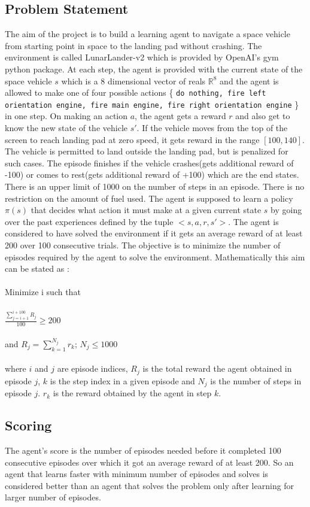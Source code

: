 \documentclass{svproc}
\begin{document}
\subsection*{Problem Statement}
The aim of the project is to build a learning agent to navigate a space vehicle from starting point in space to the landing pad without crashing. The environment is called LunarLander-v2 which is provided by OpenAI's gym python package. At each step, the agent is provided with the current state of the space vehicle $s$ which is a 8 dimensional vector of reals $\mathbb{R}^8$ and the agent is allowed to make one of four possible actions \{ \texttt{do nothing, fire left orientation engine, fire main engine, fire right orientation engine} \} in one step. On making an action $a$, the agent gets a reward $r$ and also get to know the new state of the vehicle $s'$. If the vehicle moves from the top of the screen to reach landing pad at zero speed, it gets reward in the range $[100, 140]$. The vehicle is permitted to land outside the landing pad, but is penalized for such cases. The episode finishes if the vehicle crashes(gets additional reward of -100) or comes to rest(gets additional reward of +100) which are the end states. There is an upper limit of 1000 on the number of steps in an episode. There is no restriction on the amount of fuel used. The agent is supposed to learn a policy $\pi(s)$ that decides what action it must make at a given current state $s$ by going over the past experiences defined by the tuple $<s, a, r, s'>$. The agent is considered to have solved the environment if it gets an average reward of at least 200 over 100 consecutive trials. The objective is to minimize the number of episodes required by the agent to solve the environment. Mathematically this aim can be stated as :\\\\
Minimize i such that\\\\$\frac{\displaystyle\sum_{j=i+1}^{i+100} R_j}{100} \ge 200$\\\\
and $R_j = \displaystyle\sum_{k=1}^{N_j} r_k$; $N_j \le 1000$\\\\
where $i$ and $j$ are episode indices, $R_j$ is the total reward the agent obtained in episode $j$, $k$ is the step index in a given episode and $N_j$ is the number of steps in episode $j$. $r_k$ is the reward obtained by the agent in step $k$.
\subsection*{Scoring}
The agent's score is the number of episodes needed before it completed 100 consecutive episodes over which it got an average reward of at least 200. So an agent that learns faster with minimum number of episodes and solves is considered better than an agent that solves the problem only after learning for larger number of episodes.
\end{document}
